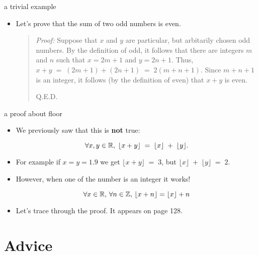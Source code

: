 \documentclass[landscape]{beamer}
\begin{document}
\begin{frame}{a trivial example}
\begin{itemize}
\item Let's prove that the sum of two odd numbers is even. \pause

\vfill

\begin{quote}
{\em Proof:} Suppose that $x$ and $y$ are particular, but arbitarily chosen odd numbers.  By the definition of odd, it follows that there are integers $m$ and $n$ such that $x=2m+1$ and $y=2n+1$.  Thus, $x+y \; = \; (2m+1) + (2n+1) \; = \; 2(m+n+1)$.  Since $m+n+1$ is an integer, it follows (by the definition of even) that $x+y$ is even.

\hspace{\fill} Q.E.D. 
\end{quote}

\vfill

\end{itemize}
\end{frame}

\begin{frame}{a proof about floor}
\begin{itemize}
\item We previously saw that this is {\bf not} true: \pause

\[ \forall x, y \in {\mathbb R}, \; \lfloor x + y \rfloor \; = \; \lfloor x \rfloor \; + \; \lfloor y \rfloor. \] \pause

\item For example if $x=y=1.9$ we get $\displaystyle \lfloor x + y \rfloor \; = \; 3$, but  $\displaystyle \lfloor x \rfloor \; + \; \lfloor y \rfloor \; = \; 2$. \pause

\item However, when one of the number is an integer it works! \pause

\begin{thm}
\[ \forall x \in {\mathbb R}, \, \forall n \in {\mathbb Z}, \, 
\lfloor x + n \rfloor = \lfloor x \rfloor + n \]
\end{thm}
\pause
\item Let's trace through the proof.  It appears on page 128. 
\end{itemize}
\end{frame}

\section{Advice}
\end{document}

